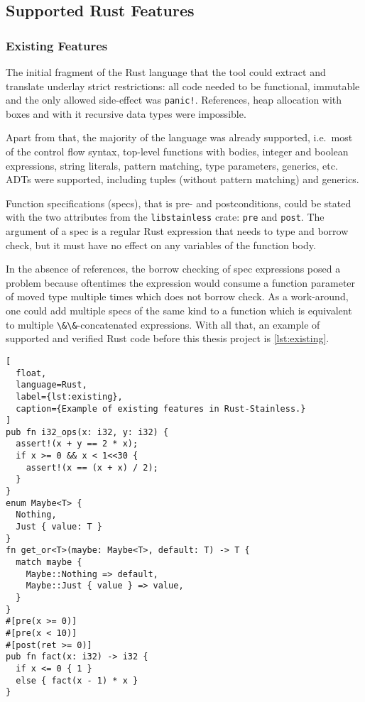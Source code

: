 \subsection{Supported Rust Features}
\label{sec:supported-features}

\subsubsection{Existing Features}

The initial fragment of the Rust language that the tool could extract
and translate underlay strict restrictions: all code needed to be
functional, immutable and the only allowed side-effect was
\passthrough{\lstinline"panic!"}. References, heap allocation with boxes
and with it recursive data types were impossible.

Apart from that, the majority of the language was already supported, i.e.~most
of the control flow syntax, top-level functions with bodies, integer and boolean
expressions, string literals, pattern matching, type parameters, generics, etc.
ADTs were supported, including tuples (without pattern matching) and generics.

Function specifications (specs), that is pre- and postconditions, could
be stated with the two attributes from the
\passthrough{\lstinline!libstainless!} crate:
\passthrough{\lstinline!pre!} and \passthrough{\lstinline!post!}. The
argument of a spec is a regular Rust expression that needs to type and
borrow check, but it must have no effect on any variables of the
function body.

In the absence of references, the borrow checking of spec expressions posed a
problem because oftentimes the expression would consume a function parameter of
moved type multiple times which does not borrow check. As a work-around, one
could add multiple specs of the same kind to a function which is equivalent to
multiple \passthrough{\lstinline!\&\&!}-concatenated expressions. With all that,
an example of supported and verified Rust code before this thesis project is
\autoref{lst:existing}.

\begin{lstlisting}[
  float,
  language=Rust,
  label={lst:existing},
  caption={Example of existing features in Rust-Stainless.}
]
pub fn i32_ops(x: i32, y: i32) {
  assert!(x + y == 2 * x);
  if x >= 0 && x < 1<<30 {
    assert!(x == (x + x) / 2);
  }
}
enum Maybe<T> {
  Nothing,
  Just { value: T }
}
fn get_or<T>(maybe: Maybe<T>, default: T) -> T {
  match maybe {
    Maybe::Nothing => default,
    Maybe::Just { value } => value,
  }
}
#[pre(x >= 0)]
#[pre(x < 10)]
#[post(ret >= 0)]
pub fn fact(x: i32) -> i32 {
  if x <= 0 { 1 }
  else { fact(x - 1) * x }
}
\end{lstlisting}

